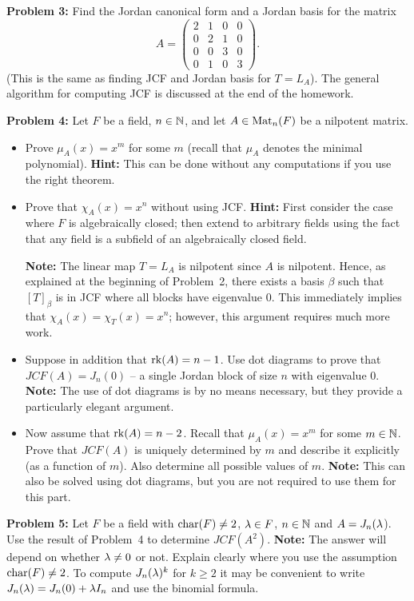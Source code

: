 \documentclass[11pt]{amsart}
\begin{document}
\skv
{\bf Problem 3:} Find the Jordan canonical form and a Jordan basis
for the matrix $$A=\begin{pmatrix}2& 1& 0& 0\\     
0& 2& 1& 0\\
0& 0& 3& 0\\
0& 1& 0& 3
\end{pmatrix}.$$
(This is the same as finding JCF and Jordan basis for $T=L_A$).
The general algorithm for computing JCF is discussed at the end of the homework.

\skv
{\bf Problem 4:} Let $F$ be a field, $n\in{\mathbb N}$, and let $A\in{\rm Mat}_n(F)$ be a nilpotent matrix.
\begin{itemize}
\item[(a)] Prove $\mu_A(x)=x^m$ for some $m$ (recall that $\mu_A$ denotes the minimal polynomial). {\bf Hint:}
This can be done without any computations if you use the right theorem.
\item[(b)] Prove that $\chi_A(x)=x^n$ without using JCF. {\bf Hint:} First consider the case where
$F$ is algebraically closed; then extend to arbitrary fields using the fact that any field is a subfield of an
algebraically closed field. 

{\bf Note:} The linear map $T=L_A$ is nilpotent since $A$ is nilpotent. Hence, as explained at the beginning of Problem~2,
there exists a basis $\beta$ such that $[T]_{\beta}$ is in JCF where all blocks have eigenvalue $0$. This immediately
implies that $\chi_A(x)=\chi_T(x)=x^n$; however, this argument requires much more work. 
\item[(c)] Suppose in addition that ${\rm rk}(A)=n-1$. Use dot diagrams to prove
that $JCF (A) = J_n(0)$ -- a single Jordan block of size $n$ with eigenvalue $0$. {\bf Note:} The use of dot diagrams 
is by no means necessary, but they provide a particularly elegant argument. 
\item[(d)] Now assume that ${\rm rk}(A)=n-2$. Recall that $\mu_A(x)=x^m$ for some $m\in{\mathbb N}$. Prove that
$JCF(A)$ is uniquely determined by $m$ and describe it explicitly (as a function of $m$). Also determine all possible
values of $m$. {\bf Note:} This can also be solved using dot diagrams, but you are not required to use them for this part. 
\end{itemize}

\skv
{\bf Problem 5:} Let $F$ be a field with ${\rm char}(F)\neq 2$, ${\lambda}\in F$, $n\in {\mathbb N}$ and $A =J_{n}({\lambda}$).
Use the result of Problem~4 to determine $JCF(A^2)$. {\bf Note:} The answer will depend on
whether ${\lambda}\neq 0$ or not. Explain clearly where you use the assumption ${\rm char}(F)\neq 2$.
To compute $J_{n}({\lambda})^k$ for $k\geq 2$ it may be convenient to write $J_{n}({\lambda})=J_n(0)+{\lambda} I_n$ and use the binomial formula.
\end{document}
